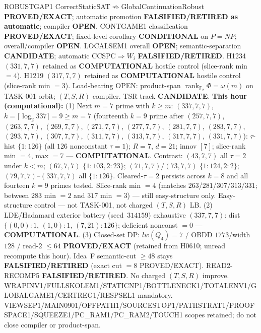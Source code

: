 \documentclass[11pt]{article}
\begin{document}
ROBUSTGAP1 CorrectStaticSAT$\not\Rightarrow$GlobalContinuationRobust \textbf{PROVED/EXACT};
automatic promotion \textbf{FALSIFIED/RETIRED as automatic}; compiler \textbf{OPEN}.
CONTGAME1 classification \textbf{PROVED/EXACT}; fixed-level corollary \textbf{CONDITIONAL} on $P=NP$;
overall/compiler \textbf{OPEN}.
LOCALSEM1 overall \textbf{OPEN}; semantic-separation \textbf{CANDIDATE}; automatic CCSPC$\Rightarrow W_i$
\textbf{FALSIFIED/RETIRED}.
H1234 $(331,7,7)$ retained as \textbf{COMPUTATIONAL} hostile control (slice-rank min $=4$).
H1219 $(317,7,7)$ retained as \textbf{COMPUTATIONAL} hostile control (slice-rank min $=3$).
Load-bearing OPEN: product-span $\operatorname{rank}_{\mathbb F_2}\Phi=\omega(m)$ on TASK-001 orbit;
$(T,S,R)$ compiler. TSR track \textbf{CANDIDATE}.
\textbf{This hour (computational):}
(1) Next $m{=}7$ prime with $k{\ge}m$: $(337,7,7)$, $k{=}\lceil\log_2 337\rceil=9{\ge}m{=}7$
(fourteenth $k{=}9$ prime after $(257,7,7)$, $(263,7,7)$, $(269,7,7)$, $(271,7,7)$, $(277,7,7)$, $(281,7,7)$, $(283,7,7)$, $(293,7,7)$, $(307,7,7)$, $(311,7,7)$, $(313,7,7)$, $(317,7,7)$, $(331,7,7)$):
$\tau$-hist $\{1{:}126\}$ (all $126$ nonconstant $\tau{=}1$); $R{=}7$, $d{=}21$; innov $[7]$;
slice-rank min $=4$, max $=7$ --- \textbf{COMPUTATIONAL}.
Contrast: $(43,7,7)$ all $\tau{=}2$ under $k{\lt}m$; $(67,7,7)$ $\{1{:}103,2{:}23\}$;
$(71,7,7)$/$(73,7,7)$ $\{1{:}124,2{:}2\}$; $(79,7,7)$--$(337,7,7)$ all $\{1{:}126\}$.
Cleared-$\tau{=}2$ persists across $k{=}8$ and all fourteen $k{=}9$ primes tested.
Slice-rank min $=4$ (matches $263$/$281$/$307$/$313$/$331$; between $283$ min $=2$ and $317$ min $=3$) --- still easy-structure only.
Easy-structure control --- not TASK-001, not charged $(T,S,R)$ LB.
(2) LDE/Hadamard exterior battery (seed~$314159$) exhaustive $(337,7,7)$:
dist $\{(0,0){:}1,\,(1,0){:}1,\,(7,21){:}126\}$; deficient nonconst $=0$ --- \textbf{COMPUTATIONAL}.
(3) Closed-set DP: $lw(Q_4)=7$ / OBDD $1773$/width $128$ / read-$2$ $\le64$
\textbf{PROVED/EXACT} (retained from H0610; unread recompute this hour).
Idea~F semantic-cut $\ge48$ stays \textbf{FALSIFIED/RETIRED} (exact cut $=8$ PROVED/EXACT).
READ2-RECOMP5 \textbf{FALSIFIED/RETIRED}. No charged $(T,S,R)$ improve.
WRAPINV1/FULLSKOLEM1/STATICNP1/BOTTLENECK1/TOTALENV1/GLOBALGAME1/CERTREG1/RESPSEL1 mandatory.
VIEWSEP1/MAIN0901/OFFPATH1/SOURCESTOP1/PATHSTRAT1/PROOFSPACE1/SQUEEZE1/PC\_RAM1/PC\_RAM2/TOUCH1 scopes retained; do not close compiler or product-span.
\end{document}
